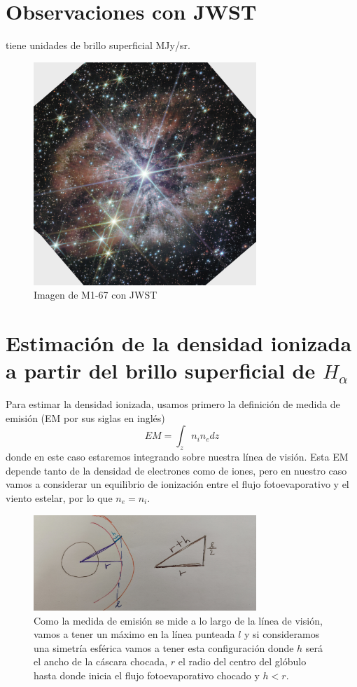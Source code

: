 \documentclass{book}
\begin{document}
\section{Observaciones con JWST}

tiene unidades de brillo superficial MJy/sr.


\begin{figure}[h]
    \centering
    \includegraphics[width=0.75\textwidth]{M1-67-JWST.jpg}
    \caption{Imagen de M1-67 con JWST}
    \label{fig:M1-67JWST}
\end{figure}

\section{Estimación de la densidad ionizada a partir del brillo superficial de $H_\alpha$}

Para estimar la densidad ionizada, usamos primero la definición de medida de emisión (EM por sus siglas en inglés)
\[EM=\int_z n_i n_edz\] donde en este caso estaremos integrando sobre nuestra línea de visión. Esta EM depende tanto de la densidad de electrones como de iones, pero en nuestro caso vamos a considerar un equilibrio de ionización entre el flujo fotoevaporativo y el viento estelar, por lo que $n_e=n_i$.

\begin{figure}[h]
    \centering    \includegraphics[width=0.75\textwidth]{images Chapter 2/C2_EM.jpg}
    \caption{Como la medida de emisión se mide a lo largo de la línea de visión, vamos a tener un máximo en la línea punteada $l$ y si consideramos una simetría esférica vamos a tener esta configuración donde $h$ será el ancho de la cáscara chocada, $r$ el radio del centro del glóbulo hasta donde inicia el flujo fotoevaporativo chocado y $h<r$.}
    \label{fig:EM}
\end{figure}
\end{document}

